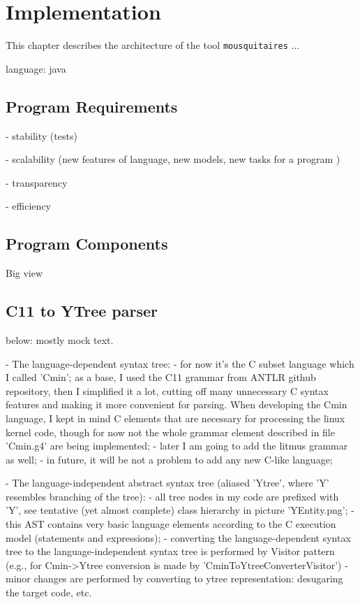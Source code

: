 \chapter{Implementation}
\label{section:impl}

This chapter describes the architecture of the tool \texttt{mousquitaires} ...

language: java


\section{Program Requirements}
\label{section:impl:requirements}

- stability (tests)

- scalability (new features of language, new models, new tasks for a program )

- transparency

- efficiency

\section{Program Components}
\label{section:impl:comp}
Big view

\section{C11 to YTree parser}
\label{section:impl:ytree}

below: mostly mock text.

- The language-dependent syntax tree:
        - for now it's the C subset language which I called 'Cmin'; as a base, I used the C11 grammar from ANTLR github repository, then I simplified it a lot, cutting off many unnecessary C syntax features and making it more convenient for parsing. When developing the Cmin language, I kept in mind C elements that are necessary for processing the linux kernel code, though for now not the whole grammar element described in file 'Cmin.g4' are being implemented;
        - later I am going to add the litmus grammar as well;
        - in future, it will be not a problem to add any new C-like language;

- The language-independent abstract syntax tree (aliased 'Ytree', where 'Y' resembles branching of the tree):
        - all tree nodes in my code are prefixed with 'Y', see tentative (yet almost complete) class hierarchy in picture 'YEntity.png';
        - this AST contains very basic language elements according to the C execution model (statements and expressions);
        - converting the language-dependent syntax tree to the language-independent syntax tree is performed by Visitor pattern (e.g., for Cmin->Ytree conversion is made by 'CminToYtreeConverterVisitor')
        - minor changes are performed by converting to ytree representation: desugaring the target code, etc.


